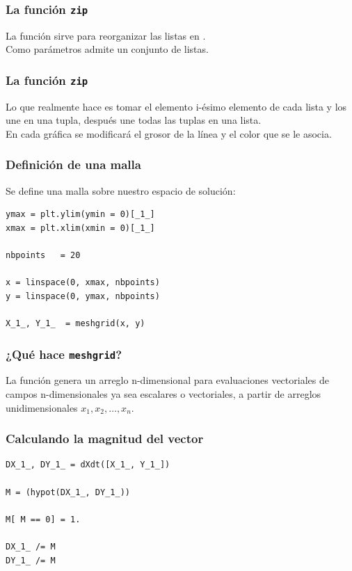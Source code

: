 \begin{frame}[fragile]
\frametitle{La función \texttt{zip}}
La función  sirve para reorganizar las listas en \python.
\\
\bigskip
Como parámetros admite un conjunto de listas. 
\end{frame}
\begin{frame}[fragile]
\frametitle{La función \texttt{zip}}
Lo que realmente hace es tomar el elemento i-ésimo elemento de cada lista y los une en una tupla, después une todas las tuplas en una lista.
\\
\medskip
En cada gráfica se modificará el grosor de la línea y el color que se le asocia.
\end{frame}
\begin{frame}[fragile]
\frametitle{Definición de una malla}
Se define una malla sobre nuestro espacio de solución:
\begin{lstlisting}[caption=Creando una malla, style=FormattedNumber, basicstyle=\linespread{1.1}\ttfamily=\small, columns=fullflexible]
ymax = plt.ylim(ymin = 0)[_1_]
xmax = plt.xlim(xmin = 0)[_1_]

nbpoints   = 20

x = linspace(0, xmax, nbpoints)
y = linspace(0, ymax, nbpoints)

X_1_, Y_1_  = meshgrid(x, y)
\end{lstlisting}
\end{frame}
\begin{frame}
\frametitle{¿Qué hace \texttt{meshgrid}?}
La función  genera un arreglo n-dimensional para evaluaciones vectoriales de campos n-dimensionales ya sea escalares o vectoriales, a partir de arreglos unidimensionales $x_{1}, x_{2}, \ldots, x_{n}$.
\end{frame}
\begin{frame}[fragile]
\frametitle{Calculando la magnitud del vector}
\begin{lstlisting}[caption=Magnitud del vector y su dirección, style=FormattedNumber, basicstyle=\linespread{1.1}\ttfamily=\small, columns=fullflexible]
DX_1_, DY_1_ = dXdt([X_1_, Y_1_])                      

M = (hypot(DX_1_, DY_1_))                           

M[ M == 0] = 1.                                 

DX_1_ /= M                                        
DY_1_ /= M
\end{lstlisting}
\end{frame}
